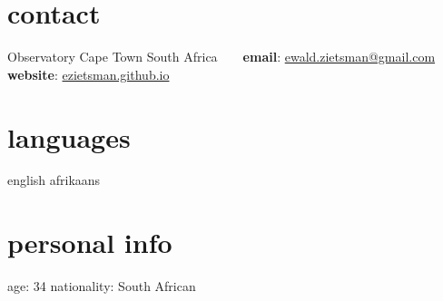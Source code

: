 \documentclass[]{friggeri-cv} %
\begin{document}


{\small
\begin{aside} %

\section{contact}
Observatory
Cape Town
South Africa
~
~
\textbf{email}:
\href{mailto:ewald.zietsman@gmail.com}{ewald.zietsman@gmail.com}
~
\textbf{website}:
\href{http://ezietsman.github.io/}{ezietsman.github.io}
\section{languages}
english
afrikaans
\section{personal info}
age: 34
nationality: South African
\end{aside}
}
\end{document}
